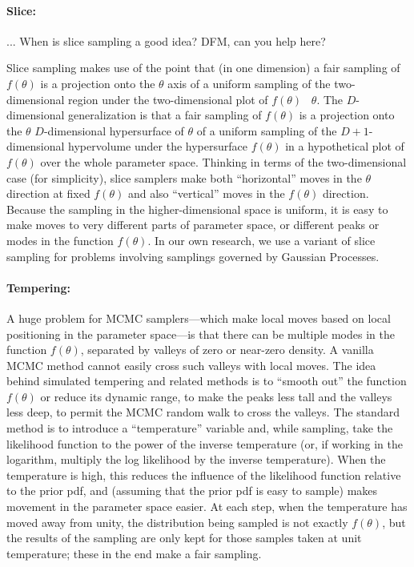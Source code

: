 \documentclass[12pt,twoside,pdftex]{article}
\newcommand{\pars}{\theta}
\begin{document}
\paragraph{Slice:}
... When is slice sampling a good idea?  DFM, can you help here?

Slice sampling makes use of the point that (in one dimension) a fair
sampling of $f(\pars)$ is a projection onto the $\pars$ axis of a
uniform sampling of the two-dimensional region under the
two-dimensional plot of $f(\pars)$ \vs\ $\pars$.
The $D$-dimensional generalization is that a fair sampling of
$f(\pars)$ is a projection onto the $\pars$ $D$-dimensional
hypersurface of $\pars$ of a uniform sampling of the $D+1$-dimensional
hypervolume under the hypersurface $f(\pars)$ in a hypothetical plot
of $f(\pars)$ over the whole parameter space.
Thinking in terms of the two-dimensional case (for simplicity), slice
samplers make both ``horizontal'' moves in the $\pars$ direction at
fixed $f(\pars)$ and also ``vertical'' moves in the $f(\pars)$
direction.
Because the sampling in the higher-dimensional space is uniform, it is
easy to make moves to very different parts of parameter space, or
different peaks or modes in the function $f(\pars)$.
In our own research, we use a variant of slice sampling for problems
involving samplings governed by Gaussian Processes.

\paragraph{Tempering:}
A huge problem for MCMC samplers---which make local moves based on
local positioning in the parameter space---is that there can be
multiple modes in the function $f(\pars)$, separated by valleys of
zero or near-zero density.
A vanilla MCMC method cannot easily cross such valleys with local
moves.
The idea behind simulated tempering and related methods is to ``smooth
out'' the function $f(\pars)$ or reduce its dynamic range, to make the
peaks less tall and the valleys less deep, to permit the MCMC random
walk to cross the valleys.
The standard method is to introduce a ``temperature'' variable and,
while sampling, take the likelihood function to the power of the
inverse temperature (or, if working in the logarithm, multiply the log
likelihood by the inverse temperature).
When the temperature is high, this reduces the influence of the
likelihood function relative to the prior pdf, and (assuming that the
prior pdf is easy to sample) makes movement in the parameter space
easier.
At each step, when the temperature has moved away from unity, the
distribution being sampled is not exactly $f(\pars)$, but the results
of the sampling are only kept for those samples taken at unit
temperature; these in the end make a fair sampling.
\end{document}
